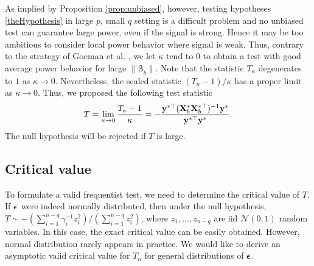 \documentclass[bj]{imsart}
\newcommand{\By}{\mathbf{y}}    \newcommand{\Bz}{\mathbf{z}}
\newcommand{\bfsym}[1]{\ensuremath{\boldsymbol{#1}}}
\def\bbeta{\bfsym \beta}
\theoremstyle{plain}
\theoremstyle{definition}
\theoremstyle{remark}
\begin{document}
As implied by Proposition \ref{prop:unbiased}, however, testing hypotheses \eqref{theHypothesis} in large $p$, small $q$ setting is a difficult problem and no unbiased test can guarantee large power, even if the signal is strong.
Hence it may be too ambitious to consider local power behavior where signal is weak.
Thus, contrary to the strategy of Goeman {\rm et al.} \cite{Goeman2006}, we let $\kappa$ tend to $0$ to obtain a test with good average power behavior for large $\|\bbeta_b\|$.
Note that the statistic $ T_{\kappa}$ degenerates to $1$ as $\kappa\to 0$.
Nevertheless, the scaled statistic $(T_{\kappa}-1)/\kappa$ has a proper limit as $\kappa\to 0$.
Thus, we proposed the following test statistic
\begin{equation*}
    T
    =
    \lim_{\kappa\to 0} \frac{T_{\kappa}-1}{\kappa}
    =
    -
     \frac{\By^{*\top} ( \BX_b^* \BX_b^{*\top} )^{-1} \By^* }{\By^{*\top} \By^*} .
\end{equation*}
The null hypothesis will be rejected if $T$ is large.




\subsection{Critical value}
To formulate a valid frequentist test, we need to determine the critical value of $T$.
If $\bepsilon$ were indeed normally distributed, then under the null hypothesis,
    $T \sim
    -
    {(\sum_{i=1}^{n-q} \gamma_i^{-1} z_i^2)}/{(\sum_{i=1}^{n-q} z_i^2)}$,
where $z_1,\ldots, z_{n-q}$ are iid $\mathcal N(0,1)$ random variables.
In this case, the exact critical value can be easily obtained.
However, normal distribution rarely appears in practice.
We would like to derive an asymptotic valid critical value for $T_{n}$ for general distributions of $\bepsilon$.
\end{document}

